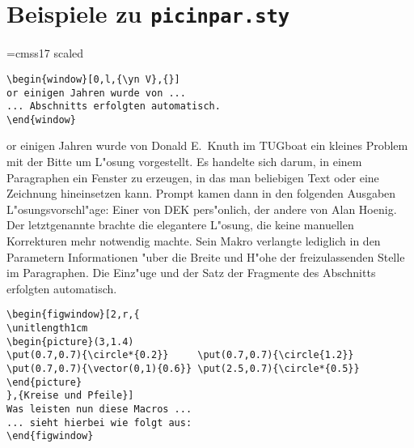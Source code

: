 %
%
%
\setlength{\parskip}{.66\baselineskip}
\setlength{\parindent}{0pt}

\section*{Beispiele zu {\tt picinpar.sty}}
\font\yn=cmss17 scaled  %
\begin{verbatim}
\begin{window}[0,l,{\yn V},{}]
or einigen Jahren wurde von ...
... Abschnitts erfolgten automatisch.
\end{window}
\end{verbatim}

\begin{window}[0,l,{\yn V},{}]
or einigen Jahren wurde von Donald E.~Knuth im TUGboat ein kleines
Problem mit der Bitte um L"osung vorgestellt. Es handelte sich darum,
in einem Paragraphen ein Fenster zu erzeugen, in das man beliebigen Text
oder eine Zeichnung hineinsetzen kann. Prompt kamen dann in den folgenden
Ausgaben L"osungsvorschl"age: Einer von DEK pers"onlich, der andere von
Alan Hoenig. Der letztgenannte brachte die elegantere L"osung, die keine
manuellen Korrekturen mehr notwendig machte. Sein Makro verlangte lediglich
in den Parametern Informationen "uber die Breite und H"ohe der
freizulassenden Stelle im Paragraphen. Die Einz"uge und der Satz der
Fragmente des Abschnitts erfolgten automatisch.
\end{window}

\begin{verbatim}
\begin{figwindow}[2,r,{
\unitlength1cm
\begin{picture}(3,1.4)
\put(0.7,0.7){\circle*{0.2}}     \put(0.7,0.7){\circle{1.2}}
\put(0.7,0.7){\vector(0,1){0.6}} \put(2.5,0.7){\circle*{0.5}}
\end{picture}
},{Kreise und Pfeile}]
Was leisten nun diese Macros ...
... sieht hierbei wie folgt aus:
\end{figwindow}
\end{verbatim}

